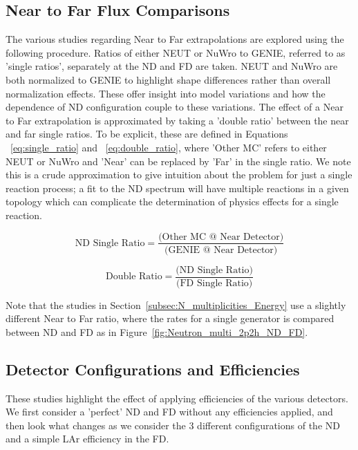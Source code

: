 \documentclass[12pt]{article}
\begin{document}
\subsection{Near to Far Flux Comparisons}
\label{subsec:ntf}
The various studies regarding Near to Far extrapolations are explored using the following procedure. Ratios of either NEUT or NuWro to GENIE, referred to as 'single ratios', separately at the ND and FD are taken. NEUT and NuWro are both normalized to GENIE to highlight shape differences rather than overall normalization effects. These offer insight into model variations and how the dependence of ND configuration couple to these variations.
The effect of a Near to Far extrapolation is approximated by taking a 'double ratio' between the near and far single ratios. To be explicit, these are defined in Equations ~\ref{eq:single_ratio} and ~\ref{eq:double_ratio}, where 'Other MC' refers to either NEUT or NuWro and 'Near' can be replaced by 'Far' in the single ratio. We note this is a crude approximation to give intuition about the problem for just a single reaction process; a fit to the ND spectrum will have multiple reactions in a given topology which can complicate the determination of physics effects for a single reaction.

\begin{equation}
\label{eq:single_ratio}
\textrm{ND Single Ratio} = \frac{\textrm{(Other MC @ Near Detector)}}{\textrm{(GENIE @ Near Detector)}}
\end{equation}

\begin{equation}
\label{eq:double_ratio}
\textrm{Double Ratio} = \frac{\textrm{(ND Single Ratio)}}{\textrm{(FD Single Ratio)}}
\end{equation}

Note that the studies in Section~\ref{subsec:N_multiplicities_Energy} use a slightly different Near to Far ratio, where the rates for a single generator is compared between ND and FD as in Figure~\ref{fig:Neutron_multi_2p2h_ND_FD}.
\subsection{Detector Configurations and Efficiencies}
\label{subsec:eff}
These studies highlight the effect of applying efficiencies of the various detectors. We first consider a 'perfect' ND and FD without any efficiencies applied, and then look what changes as we consider the 3 different configurations of the ND and a simple LAr efficiency in the FD. 
\end{document}
